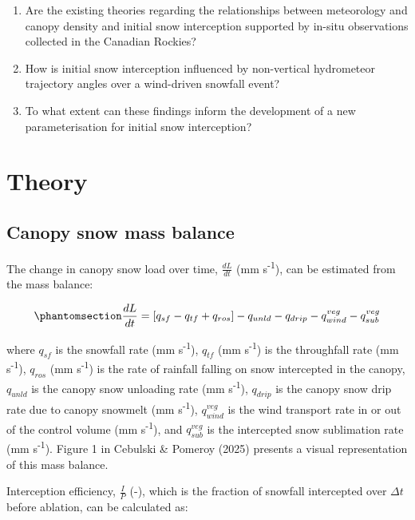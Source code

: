 \documentclass[
  letterpaper,
  DIV=11,
  numbers=noendperiod]{scrartcl}
\begin{document}
\begin{enumerate}
\def\labelenumi{\arabic{enumi}.}
\item
  Are the existing theories regarding the relationships between
  meteorology and canopy density and initial snow interception supported
  by in-situ observations collected in the Canadian Rockies?
\item
  How is initial snow interception influenced by non-vertical
  hydrometeor trajectory angles over a wind-driven snowfall event?
\item
  To what extent can these findings inform the development of a new
  parameterisation for initial snow interception?
\end{enumerate}

\section{Theory}\label{theory}

\subsection{Canopy snow mass balance}\label{canopy-snow-mass-balance}

The change in canopy snow load over time, \(\frac{dL}{dt}\) (mm
s\textsuperscript{-1}), can be estimated from the mass balance:

\begin{equation}\phantomsection\label{eq-canopy-mass-bal}{
\frac{dL}{dt} = 
[q_{sf} - q_{tf} + q_{ros}] - q_{unld} - q_{drip} - q_{wind}^{veg} - q_{sub}^{veg}
}\end{equation}

where \(q_{sf}\) is the snowfall rate (mm s\textsuperscript{-1}),
\(q_{tf}\) (mm s\textsuperscript{-1}) is the throughfall rate (mm
s\textsuperscript{-1}), \(q_{ros}\) (mm s\textsuperscript{-1}) is the
rate of rainfall falling on snow intercepted in the canopy, \(q_{unld}\)
is the canopy snow unloading rate (mm s\textsuperscript{-1}),
\(q_{drip}\) is the canopy snow drip rate due to canopy snowmelt (mm
s\textsuperscript{-1}), \(q_{wind}^{veg}\) is the wind transport rate in
or out of the control volume (mm s\textsuperscript{-1}), and
\(q_{sub}^{veg}\) is the intercepted snow sublimation rate (mm
s\textsuperscript{-1}). Figure 1 in Cebulski \& Pomeroy (2025) presents
a visual representation of this mass balance.

Interception efficiency, \(\frac{I}{P}\) (-), which is the fraction of
snowfall intercepted over \(\Delta t\) before ablation, can be
calculated as:
\end{document}
